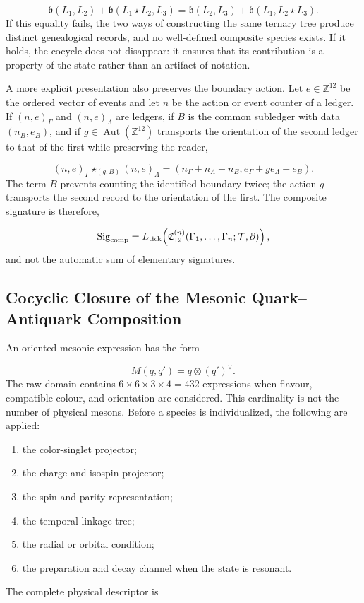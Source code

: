 \[
\mathfrak b(L_1,L_2)
+\mathfrak b(L_1\star L_2,L_3)
=
\mathfrak b(L_2,L_3)
+\mathfrak b(L_1,L_2\star L_3).
\]
If this equality fails, the two ways of constructing the same ternary tree produce distinct genealogical records, and no well-defined composite species exists. If it holds, the cocycle does not disappear: it ensures that its contribution is a property of the state rather than an artifact of notation.

A more explicit presentation also preserves the boundary action. Let \(e\in\mathbb Z^{12}\) be the ordered vector of events and let \(n\) be the action or event counter of a ledger. If \((n,e)_\Gamma\) and \((n,e)_\Lambda\) are ledgers, if \(B\) is the common subledger with data \((n_B,e_B)\), and if \(g\in\operatorname{Aut}(\mathbb Z^{12})\) transports the orientation of the second ledger to that of the first while preserving the reader,

\[
(n,e)_\Gamma\star_{(g,B)}(n,e)_\Lambda
=
(n_\Gamma+n_\Lambda-n_B,
e_\Gamma+g e_\Lambda-e_B).
\]
The term \(B\) prevents counting the identified boundary twice; the action \(g\) transports the second record to the orientation of the first. The composite signature is therefore,

\[
\operatorname{Sig}_{\rm comp}
=L_{\rm tick}\!\left(
\mathfrak C_{12}^{(n)}
(\Gamma_1,\ldots,\Gamma_n;\mathcal T,\partial)
\right),
\]
and not the automatic sum of elementary signatures.

\subsection{Cocyclic Closure of the Mesonic Quark–Antiquark Composition}
An oriented mesonic expression has the form

\[
M(q,q')=q\otimes(q')^\vee.
\]
The raw domain contains \(6\times6\times3\times4=432\) expressions when flavour, compatible colour, and orientation are considered. This cardinality is not the number of physical mesons. Before a species is individualized, the following are applied:

\begin{enumerate}
\item the color-singlet projector;
\item the charge and isospin projector;
\item the spin and parity representation;
\item the temporal linkage tree;
\item the radial or orbital condition;
\item the preparation and decay channel when the state is resonant.
\end{enumerate}
The complete physical descriptor is

